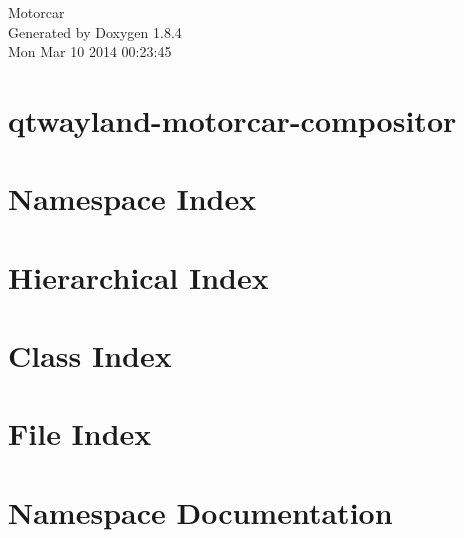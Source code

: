 \documentclass[twoside]{book}
\newcommand{\clearemptydoublepage}{%
  \newpage{\pagestyle{empty}\cleardoublepage}%
}
\begin{document}
\hypersetup{pageanchor=false}
\begin{titlepage}
\vspace*{7cm}
\begin{center}%
{\Large Motorcar }\\
\vspace*{1cm}
{\large Generated by Doxygen 1.8.4}\\
\vspace*{0.5cm}
{\small Mon Mar 10 2014 00:23:45}\\
\end{center}
\end{titlepage}
\clearemptydoublepage
\tableofcontents
\clearemptydoublepage
{}
\hypersetup{pageanchor=true}

\chapter{qtwayland-\/motorcar-\/compositor}
\label{md__home_dave_thesis_qtwayland-motorcar-compositor_README}
\hypertarget{md__home_dave_thesis_qtwayland-motorcar-compositor_README}{}

\chapter{Namespace Index}

\chapter{Hierarchical Index}

\chapter{Class Index}

\chapter{File Index}

\chapter{Namespace Documentation}


\end{document}
